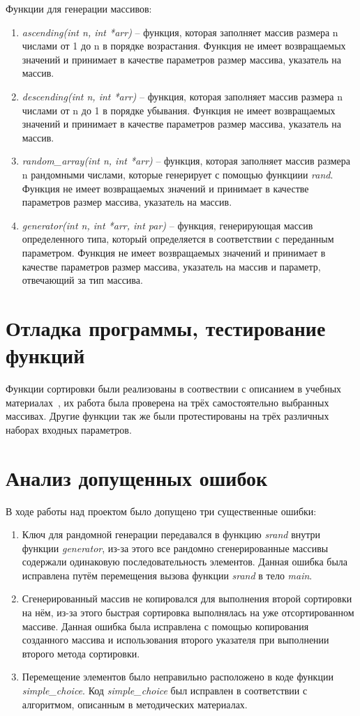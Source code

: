 \documentclass[a4paper,12pt,titlepage,finall]{article}
\begin{document}
Функции для генерации массивов:
\begin{enumerate}
    \item \emph{ascending(int n, int *arr)} – функция, которая заполняет массив размера n числами от 1 до n в порядке возрастания. Функция не имеет возвращаемых значений и принимает в качестве параметров размер массива, указатель на массив.
    \item \emph{descending(int n, int *arr)} – функция, которая заполняет массив размера n числами от n до 1 в порядке убывания. Функция не имеет возвращаемых значений и принимает в качестве параметров размер массива, указатель на массив.
    \item \emph{random\_array(int n, int *arr)} – функция, которая заполняет массив размера n рандомными числами, которые генерирует с помощью функциии \emph{rand}. Функция не имеет возвращаемых значений и принимает в качестве параметров размер массива, указатель на массив.
     \item \emph{generator(int n, int *arr, int par)} – функция, генерирующая массив определенного типа, который определяется в соответствии с переданным параметром. Функция не имеет возвращаемых значений и принимает в качестве параметров размер массива, указатель на массив и параметр, отвечающий за тип массива.
\end{enumerate}

\newpage

\section{Отладка программы, тестирование функций}

Функции сортировки были реализованы в соотвествии с описанием в учебных материалах~\cite{bookcs}, их работа была проверена на трёх самостоятельно выбранных массивах. Другие функции так же были протестированы на трёх различных наборах входных параметров.

\section{Анализ допущенных ошибок}

В ходе работы над проектом было допущено три существенные ошибки:
\begin{enumerate}
\item Ключ для рандомной генерации передавался в функцию \emph{srand} внутри функции \emph{generator}, из-за этого все рандомно сгенерированные массивы содержали одинаковую последовательность элементов. Данная ошибка была исправлена путём перемещения вызова функции \emph{srand} в тело \emph{main}.
\item Сгенерированный массив не копировался для выполнения второй сортировки на нём, из-за этого быстрая сортировка выполнялась на уже отсортированном массиве. Данная ошибка была исправлена с помощью копирования созданного массива и использования второго указателя при выполнении второго метода сортировки.
\item Перемещение элементов было неправильно расположено в коде функции \emph{simple\_choice}. Код \emph{simple\_choice} был исправлен в соответствии с алгоритмом, описанным в методических материалах. 
\end{enumerate}
\end{document}
